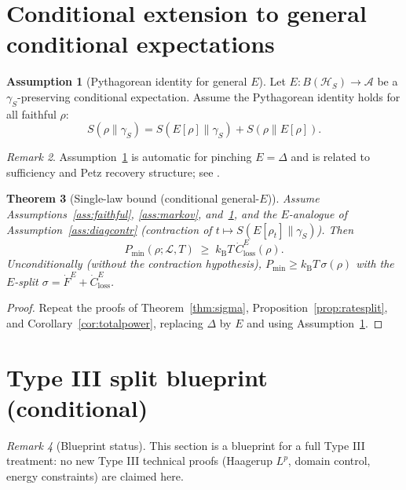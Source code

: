 \documentclass[11pt,a4paper]{article}
\theoremstyle{plain}
\newtheorem{theorem}{Theorem}[section]
\theoremstyle{definition}
\newtheorem{assumption}[theorem]{Assumption}
\theoremstyle{remark}
\newtheorem{remark}[theorem]{Remark}
\newcommand{\kB}{k_{\mathrm{B}}}
\newcommand{\Pmin}{P_{\min}}
\newcommand{\ClossE}{\dot{C}^{E}_{\mathrm{loss}}}
\begin{document}
\section{Conditional extension to general conditional expectations}

\begin{assumption}[Pythagorean identity for general $E$]\label{ass:pythE}
Let $E: B(\mathcal{H}_S) \to \mathcal{A}$ be a $\gamma_S$-preserving
conditional expectation. Assume the Pythagorean identity holds for all faithful
$\rho$:
\begin{equation}
S(\rho\|\gamma_S) = S(E[\rho]\|\gamma_S) + S(\rho\|E[\rho]).
\end{equation}
\end{assumption}

\begin{remark}
Assumption~\ref{ass:pythE} is automatic for pinching $E = \Delta$ and is
related to sufficiency and Petz recovery structure; see
\cite{Petz86,Takesaki03}.
\end{remark}

\begin{theorem}[Single-law bound (conditional general-$E$)]\label{thm:generalE}
Assume Assumptions~\ref{ass:faithful}, \ref{ass:markov}, and~\ref{ass:pythE},
and the $E$-analogue of Assumption~\ref{ass:diagcontr} (contraction of
$t \mapsto S(E[\rho_t]\|\gamma_S)$). Then
\begin{equation}
\Pmin(\rho; \mathcal{L}, T) \;\ge\; \kB T\, \ClossE(\rho).
\end{equation}
Unconditionally (without the contraction hypothesis),
$\Pmin \ge \kB T\,\sigma(\rho)$ with the $E$-split
$\sigma = \dot{F}^E + \ClossE$.
\end{theorem}

\begin{proof}
Repeat the proofs of Theorem~\ref{thm:sigma},
Proposition~\ref{prop:ratesplit}, and Corollary~\ref{cor:totalpower},
replacing $\Delta$ by $E$ and using Assumption~\ref{ass:pythE}.
\end{proof}

\section{Type III split blueprint (conditional)}\label{sec:typeiii}

\begin{remark}[Blueprint status]
This section is a blueprint for a full Type III treatment: no new Type III
technical proofs (Haagerup $L^p$, domain control, energy constraints) are
claimed here.
\end{remark}
\end{document}

